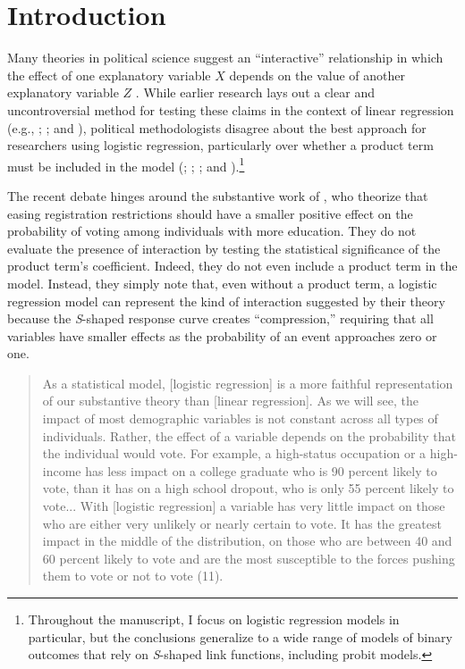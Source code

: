 \documentclass[12pt]{article}
\begin{document}
\doublespace


\section*{Introduction}

Many theories in political science suggest an ``interactive'' relationship in which the effect of one explanatory variable $X$ depends on the value of another explanatory variable $Z$ \citep{ClarkGilliganGolder2006, BerryGolderMilton2012}. While earlier research lays out a clear and uncontroversial method for testing these claims in the context of linear regression (e.g., \citealt{KamFranzese2007}; \citealt{BramborClarkGolder2006}; and \citealt{Friedrich1982}), political methodologists disagree about the best approach for researchers using logistic regression, particularly over whether a product term must be included in the model (\citealt{Nagler1991}; \citealt{Frant1991}; \citealt{BerryBerry1991}; and \citealt{BerryDeMerittEsarey2010}).\footnote{Throughout the manuscript, I focus on logistic regression models in particular, but the conclusions generalize to a wide range of models of binary outcomes that rely on \textit{S}-shaped link functions, including probit models.}  


The recent debate hinges around the substantive work of \cite{WolfingerRosenstone1980}, who theorize that easing registration restrictions should have a smaller positive effect on the probability of voting among individuals with more education. They do not evaluate the presence of interaction by testing the statistical significance of the product term's coefficient. Indeed, they do not even include a product term in the model. Instead, they simply note that, even without a product term, a logistic regression model can represent the kind of interaction suggested by their theory because the \textit{S}-shaped response curve creates ``compression,'' requiring that all variables have smaller effects as the probability of an event approaches zero or one. 

\begin{quote}\singlespace
As a statistical model, [logistic regression] is a more faithful representation of our substantive theory than [linear regression]. As we will see, the impact of most demographic variables is not constant across all types of individuals. Rather, the effect of a variable depends on the probability that the individual would vote. For example, a high-status occupation or a high-income has less impact on a college graduate who is 90 percent likely to vote, than it has on a high school dropout, who is only 55 percent likely to vote... With [logistic regression] a variable has very little impact on those who are either very unlikely or nearly certain to vote. It has the greatest impact in the middle of the distribution, on those who are between 40 and 60 percent likely to vote and are the most susceptible to the forces pushing them to vote or not to vote (11).
\end{quote}
\end{document}
